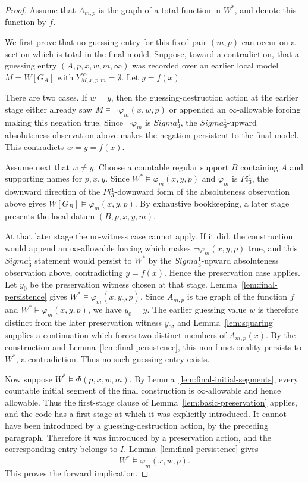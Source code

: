 \documentclass{article}
\theoremstyle{remark}
\theoremstyle{plain}
\def\Pi{Pi}%
\def\Sigma{Sigma}%
\begin{document}
\begin{proof}
Assume that $A_{m,p}$ is the graph of a total function in $W^*$, and denote this
function by $f$.

We first prove that no guessing entry for this fixed pair $(m,p)$ can occur on a
section which is total in the final model. Suppose, toward a contradiction, that
a guessing entry $(A,p,x,w,m,\infty)$ was recorded over an earlier local model
$M=W[G_A]$ with $Y^\infty_{M,x,p,m}=\emptyset$. Let $y=f(x)$.

There are two cases. If $w=y$, then the guessing-destruction action at the
earlier stage either already saw $M\models\neg\varphi_m(x,w,p)$ or appended an
$\infty$-allowable forcing making this negation true. Since
$\neg\varphi_m$ is $\Sigma^1_3$, the $\Sigma^1_3$-upward absoluteness
observation above makes the
negation persistent to the final model. This contradicts
$w=y=f(x)$.

Assume next that $w\neq y$. Choose a countable regular support $B$ containing
$A$ and supporting names for $p,x,y$. Since
$W^*\models\varphi_m(x,y,p)$ and $\varphi_m$ is $\Pi^1_3$, the downward direction
of the $\Pi^1_3$-downward form of the absoluteness observation above gives
$W[G_B]\models\varphi_m(x,y,p)$. By exhaustive bookkeeping, a later stage
presents the local datum $(B,p,x,y,m)$.

At that later stage the no-witness case cannot apply. If it did, the
construction would append an $\infty$-allowable forcing which makes
$\neg\varphi_m(x,y,p)$ true, and this $\Sigma^1_3$ statement would persist to
$W^*$ by the $\Sigma^1_3$-upward absoluteness observation above,
contradicting $y=f(x)$. Hence the
preservation case applies. Let $y_0$ be the preservation witness chosen at that
stage. Lemma~\ref{lem:final-persistence} gives
$W^*\models\varphi_m(x,y_0,p)$. Since $A_{m,p}$ is the graph of the function $f$
and $W^*\models\varphi_m(x,y,p)$, we have $y_0=y$. The earlier guessing value
$w$ is therefore distinct from the later preservation witness $y_0$, and
Lemma~\ref{lem:squaring} supplies a continuation which forces two distinct
members of $A_{m,p}(x)$. By the construction and Lemma~\ref{lem:final-persistence},
this non-functionality persists to $W^*$, a contradiction. Thus no such guessing
entry exists.

Now suppose $W^*\models\Phi(p,x,w,m)$. By
Lemma~\ref{lem:final-initial-segments}, every countable initial segment of the
final construction is $\infty$-allowable and hence allowable. Thus the
first-stage clause of Lemma~\ref{lem:basic-preservation} applies, and the code
has a first stage at which it was explicitly introduced. It cannot have been
introduced by a guessing-destruction action, by the preceding paragraph.
Therefore it was introduced by a preservation action, and the corresponding entry
belongs to $I$. Lemma~\ref{lem:final-persistence} gives
\[
   W^*\models\varphi_m(x,w,p).
\]
This proves the forward implication.


\end{proof}
\end{document}
